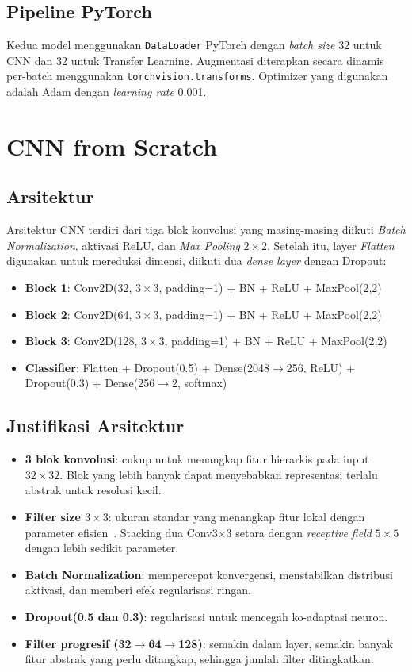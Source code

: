 \documentclass[conference]{IEEEtran}
\begin{document}
\subsection{Pipeline PyTorch}
Kedua model menggunakan \texttt{DataLoader} PyTorch dengan \textit{batch size} 32 untuk CNN dan 32 untuk Transfer Learning. Augmentasi diterapkan secara dinamis per-batch menggunakan \texttt{torchvision.transforms}. Optimizer yang digunakan adalah Adam dengan \textit{learning rate} 0.001.

\section{CNN from Scratch}
\subsection{Arsitektur}
Arsitektur CNN terdiri dari tiga blok konvolusi yang masing-masing diikuti \textit{Batch Normalization}, aktivasi ReLU, dan \textit{Max Pooling} $2\times2$. Setelah itu, layer \textit{Flatten} digunakan untuk mereduksi dimensi, diikuti dua \textit{dense layer} dengan Dropout:
\begin{itemize}
\item \textbf{Block 1}: Conv2D(32, $3\times3$, padding=1) + BN + ReLU + MaxPool(2,2)
\item \textbf{Block 2}: Conv2D(64, $3\times3$, padding=1) + BN + ReLU + MaxPool(2,2)
\item \textbf{Block 3}: Conv2D(128, $3\times3$, padding=1) + BN + ReLU + MaxPool(2,2)
\item \textbf{Classifier}: Flatten + Dropout(0.5) + Dense(2048$\rightarrow$256, ReLU) + Dropout(0.3) + Dense(256$\rightarrow$2, softmax)
\end{itemize}

\subsection{Justifikasi Arsitektur}
\begin{itemize}
\item \textbf{3 blok konvolusi}: cukup untuk menangkap fitur hierarkis pada input $32\times32$. Blok yang lebih banyak dapat menyebabkan representasi terlalu abstrak untuk resolusi kecil.
\item \textbf{Filter size $3\times3$}: ukuran standar yang menangkap fitur lokal dengan parameter efisien~\cite{simonyan2014}. Stacking dua Conv3$\times$3 setara dengan \textit{receptive field} $5\times5$ dengan lebih sedikit parameter.
\item \textbf{Batch Normalization}: mempercepat konvergensi, menstabilkan distribusi aktivasi, dan memberi efek regularisasi ringan.
\item \textbf{Dropout(0.5 dan 0.3)}: regularisasi untuk mencegah ko-adaptasi neuron.
\item \textbf{Filter progresif (32$\rightarrow$64$\rightarrow$128)}: semakin dalam layer, semakin banyak fitur abstrak yang perlu ditangkap, sehingga jumlah filter ditingkatkan.
\end{itemize}
\end{document}
